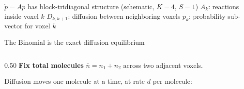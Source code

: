 \documentclass[10pt,aspectratio=169]{beamer}
\begin{document}
\begin{frame}{$\dot{p} = Ap$ has block-tridiagonal structure \textnormal{\small(schematic, $K{=}4$, $S{=}1$)}}
\vspace{0.3em}
{\small
  \textcolor{myblue!80!black}{$A_k$}: reactions inside voxel $k$
  \hspace{1.5em}
  \textcolor{slowred!80!black}{$D_{k,k+1}$}: diffusion between neighboring voxels
  \hspace{1.5em}
  $p_k$: probability sub-vector for voxel $k$
}

\end{frame}

\begin{frame}{The Binomial is the exact diffusion equilibrium}

  \begin{columns}[T]
    \begin{column}{0.50\textwidth}
      \textbf{Fix total molecules} $\bar n = n_1 + n_2$ across two adjacent voxels.

      \smallskip
      Diffusion moves one molecule at a time, at rate $d$ per molecule:

      \begin{center}
      \end{center}


\end{column}
\end{columns}
\end{frame}
\end{document}
